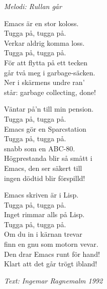 {\footnotesize\textit{Melodi: Rullan går}}\par
\vspace{10pt}
Emacs är en stor koloss.\\
Tugga på, tugga på.\\
Verkar aldrig komma loss.\\
Tugga på, tugga på.\\
För att flytta på ett tecken\\
går två meg i garbage-säcken.\\
Ner i skärmens undre ran'\\
står: garbage collecting, done!\par
\vspace{10pt}
Väntar på'n till min pension.\\
Tugga på, tugga på.\\
Emacs gör en Sparcstation\\
Tugga på, tugga på.\\
snabb som en ABC-80.\\
Högprestanda blir så smått i\\
Emacs, den ser säkert till\\
ingen dödtid blir förspilld!\par
\vspace{10pt}
Emacs skriven är i Lisp.\\
Tugga på, tugga på.\\
Inget rimmar alls på Lisp.\\
Tugga på, tugga på.\\
Om du in i kärnan trevar\\
finn en gnu som motorn vevar.\\
Den drar Emacs runt för hand!\\
Klart att det går trögt ibland!\par
\vspace{10pt}
{\footnotesize\textit{Text: Ingemar Ragnemalm 1992}}
